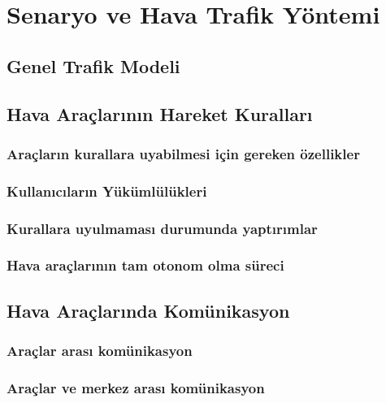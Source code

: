 \newpage



\section{Senaryo ve Hava Trafik Yöntemi}


\subsection{Genel Trafik Modeli}

\subsection{Hava Araçlarının Hareket Kuralları}
\subsubsection{Araçların kurallara uyabilmesi için gereken özellikler}
\subsubsection{Kullanıcıların Yükümlülükleri}
\subsubsection{Kurallara uyulmaması durumunda yaptırımlar}
\subsubsection{Hava araçlarının tam otonom olma süreci}

\subsection{Hava Araçlarında Komünikasyon}

\subsubsection{Araçlar arası komünikasyon}
\subsubsection{Araçlar ve merkez arası komünikasyon}
